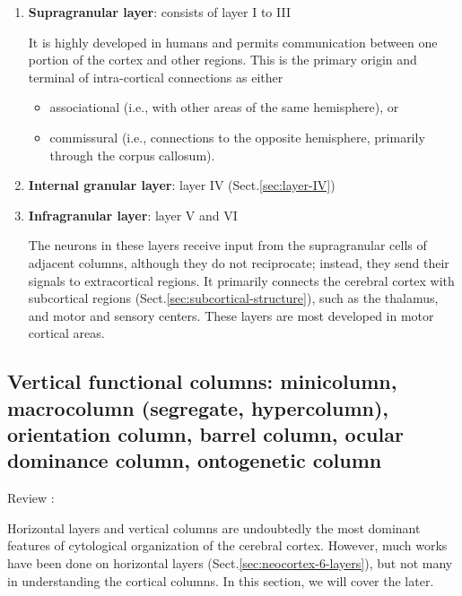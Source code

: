 \begin{enumerate}
  \item {\bf Supragranular layer}: consists of layer I to III
  
  It is highly developed in humans and permits communication between one portion
  of the cortex and other regions. This is the primary origin and terminal of
  intra-cortical connections as either
  \begin{itemize}
    \item associational (i.e., with other areas of the same hemisphere), or
    \item commissural (i.e., connections to the opposite hemisphere, primarily
    through the corpus callosum).
  \end{itemize}
  
  \item {\bf Internal granular layer}: layer IV (Sect.\ref{sec:layer-IV})
  
  
  \item {\bf Infragranular layer}: layer V and VI
  
  The neurons in these layers receive input from the supragranular cells of
  adjacent columns, although they do not reciprocate; instead, they send their
  signals to extracortical regions. 
  It primarily connects the cerebral cortex with subcortical regions
  (Sect.\ref{sec:subcortical-structure}), such as the
  thalamus, and motor and sensory centers. These layers are most
  developed in motor cortical areas.
   
\end{enumerate}



\subsection{Vertical functional columns: minicolumn, macrocolumn (segregate, hypercolumn), orientation column, barrel
column, ocular dominance column, ontogenetic column}
\label{sec:neocortex_functional-column}
\label{sec:vertical_functional-column}


Review \citep{buxhoeveden2002, rakic2008, jones2010}: 

Horizontal layers and vertical columns are undoubtedly the most dominant
features of cytological organization of the cerebral cortex. However, much works
have been done on horizontal layers (Sect.\ref{sec:neocortex-6-layers}), but not
many in understanding the cortical columns. In this section, we will cover the
later.

